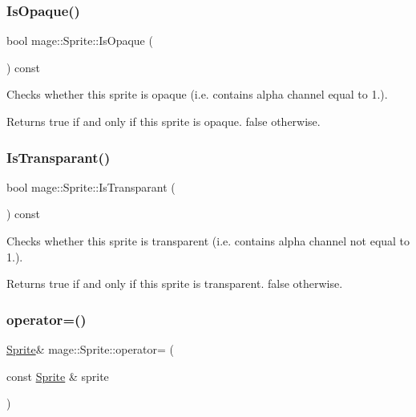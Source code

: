 \subsubsection{\texorpdfstring{Is\+Opaque()}{IsOpaque()}}
{\footnotesize\ttfamily bool mage\+::\+Sprite\+::\+Is\+Opaque (\begin{DoxyParamCaption}{ }\end{DoxyParamCaption}) const\hspace{0.3cm}{\ttfamily [noexcept]}}

Checks whether this sprite is opaque (i.\+e. contains alpha channel equal to 1.).

\begin{DoxyReturn}{Returns}
{\ttfamily true} if and only if this sprite is opaque. {\ttfamily false} otherwise. 
\end{DoxyReturn}
\hypertarget{classmage_1_1_sprite_a0ab488942bb2572a4b62065f0197c618}{}\label{classmage_1_1_sprite_a0ab488942bb2572a4b62065f0197c618} 
\subsubsection{\texorpdfstring{Is\+Transparant()}{IsTransparant()}}
{\footnotesize\ttfamily bool mage\+::\+Sprite\+::\+Is\+Transparant (\begin{DoxyParamCaption}{ }\end{DoxyParamCaption}) const\hspace{0.3cm}{\ttfamily [noexcept]}}

Checks whether this sprite is transparent (i.\+e. contains alpha channel not equal to 1.).

\begin{DoxyReturn}{Returns}
{\ttfamily true} if and only if this sprite is transparent. {\ttfamily false} otherwise. 
\end{DoxyReturn}
\hypertarget{classmage_1_1_sprite_aa24dfc716d8b79cc16b4c27409f8cc6b}{}\label{classmage_1_1_sprite_aa24dfc716d8b79cc16b4c27409f8cc6b} 
\subsubsection{\texorpdfstring{operator=()}{operator=()}\hspace{0.1cm}{\footnotesize\ttfamily [1/2]}}
{\footnotesize\ttfamily \hyperlink{classmage_1_1_sprite}{Sprite}\& mage\+::\+Sprite\+::operator= (\begin{DoxyParamCaption}\item[{const \hyperlink{classmage_1_1_sprite}{Sprite} \&}]{sprite }\end{DoxyParamCaption})\hspace{0.3cm}{\ttfamily [delete]}}

